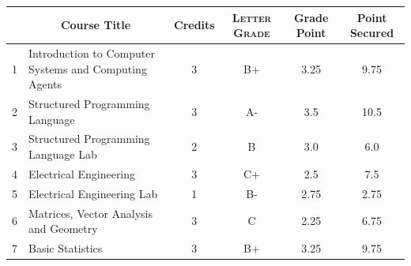 \documentclass[11pt]{article}
\newcommand*{\numtwo}[1]{\pgfmathprintnumber[
                    fixed, precision=2, fixed zerofill=true]{#1}}
\begin{document}
                \begin{center}
                    \renewcommand{\arraystretch}{1.08}
                    
                \begin{tabular}{|c|l|c|>{\scshape}c|c|c|}
                \hline  \rule[-1ex]{0pt}{3.5ex} {\centering{\bf Course Code}} &  \multicolumn{1}{c|}{\textbf{Course Title}}  & {\bf Credits} & {\bf Letter Grade} & {\bf Grade Point} & {\bf Point Secured}  \\ 
                \hline   1 &  Introduction to Computer Systems and Computing Agents		 & 3 & B+ & 3.25 & 9.75 \\ %
                \hline   2 &  Structured Programming Language		 & 3 & A- & 3.5 & 10.5 \\ %
                \hline   3 &  Structured Programming Language Lab		 & 2 & B & 3.0 & 6.0 \\ %
                \hline   4 &  Electrical Engineering		 & 3 & C+ & 2.5 & 7.5 \\ %
                \hline   5 &  Electrical Engineering Lab		 & 1 & B- & 2.75 & 2.75 \\ %
                \hline   6 &  Matrices, Vector Analysis and Geometry		 & 3 & C & 2.25 & 6.75 \\ %
                \hline   7 &  Basic Statistics		 & 3 & B+ & 3.25 & 9.75 \\ %

\hline                %
                \end{tabular}
                \end{center}
                \renewcommand{\arraystretch}{1.03}
\end{document}
